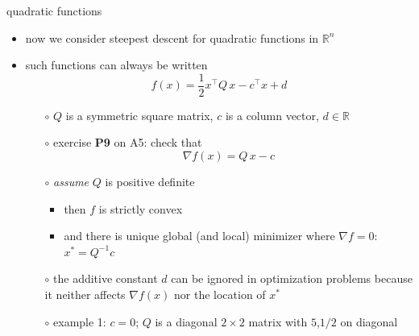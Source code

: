 \documentclass[10pt,hyperref]{beamer}
\newcommand{\grad}{\nabla}
\newcommand{\RR}{\mathbb{R}}
\begin{document}
\begin{frame}{quadratic functions}

\begin{itemize}
\item now we consider steepest descent for quadratic functions in $\RR^n$
\item such functions can always be written
    $$f(x) = \frac{1}{2} x^\top Q\, x - c^\top x + d$$
    \begin{itemize}
    \vspace{-3mm}
    \item[$\circ$] $Q$ is a symmetric square matrix, $c$ is a column vector, $d\in \RR$
    \item[$\circ$] exercise \textbf{P9} on A5: check that
        $$\grad f(x) = Q\, x - c$$
    \item[$\circ$] \emph{assume} $Q$ is positive definite
            \begin{itemize}
            \item then $f$ is strictly convex
            \item and there is unique global (and local) minimizer where $\grad f=0$: \hfill $x^* = Q^{-1} c$
            \end{itemize}
    \item[$\circ$] the additive constant $d$ can be ignored in optimization problems because it neither affects $\grad f(x)$ nor the location of $x^*$
    \item[$\circ$] example 1: $c=0$; $Q$ is a diagonal $2\times 2$ matrix with $5$,$1/2$ on diagonal
    \end{itemize}
\end{itemize}
\end{frame}
\end{document}
